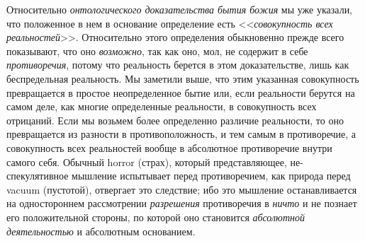 Относительно {\em онтологического доказательства бытия
божия} мы уже указали, что положенное в нем в основание определение есть
<<{\em совокупность всех реальностей}>>. Относительно
этого определения обыкновенно прежде всего показывают, что оно
{\em возможно}, так как оно, мол, не содержит в себе
{\em противоречия}, потому что реальность берется в
этом доказательстве, лишь как беспредельная реальность. Мы заметили выше,
что этим указанная совокупность превращается в простое неопределенное бытие
или, если реальности берутся на самом деле, как многие определенные
реальности, в совокупность всех отрицаний. Если мы возьмем более
определенно различие реальности, то оно превращается из разности в
противоположность, и тем самым в противоречие, а совокупность всех
реальностей вообще в абсолютное противоречие внутри самого себя. Обычный
horror (страх), который представляющее, не-спекулятивное мышление
испытывает перед противоречием, как природа перед vacuum (пустотой),
отвергает это следствие; ибо это мышление останавливается на одностороннем
рассмотрении {\em разрешения} противоречия в
{\em ничто} и не познает его положительной стороны, по
которой оно становится {\em абсолютной деятельностью} и
абсолютным основанием.

